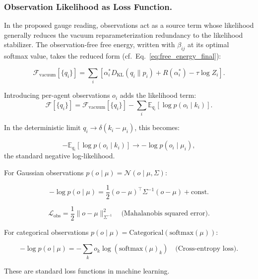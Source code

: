\documentclass[twoside,11pt]{article}
\begin{document}
\subsubsection{Observation Likelihood as Loss Function.}

In the proposed gauge reading, observations act as a source term whose likelihood generally reduces the vacuum reparameterization redundancy to the likelihood stabilizer. The observation-free free energy, written with $\beta_{ij}$ at its optimal softmax value, takes the reduced form (cf.\ Eq.~\ref{eq:free_energy_final}):

\begin{equation}
\mathcal{F}_{\text{vacuum}}[\{q_i\}]
=\sum_i\left[\alpha_i^*D_{\mathrm{KL}}(q_i\|p_i)+R(\alpha_i^*)-\tau\log Z_i\right].
\end{equation}

Introducing per-agent observations $o_i$ adds the likelihood term:
\begin{equation}
\mathcal{F}[\{q_i\}] = \mathcal{F}_{\text{vacuum}}[\{q_i\}] - \sum_i \mathbb{E}_{q_i}[\log p(o_i \mid k_i)].
\end{equation}

In the deterministic limit $q_i \to \delta(k_i - \mu_i)$, this becomes:

\begin{equation}
-\mathbb{E}_{q_i}[\log p(o_i \mid k_i)] \to -\log p(o_i \mid \mu_i),
\end{equation}
the standard negative log-likelihood.

For Gaussian observations $p(o \mid \mu) = \mathcal{N}(o \mid \mu, \Sigma)$:

\begin{equation}
-\log p(o \mid \mu) = \frac{1}{2}(o - \mu)^\top \Sigma^{-1} (o - \mu) + \text{const.}
\end{equation}

\begin{equation}
\mathcal{L}_{\text{obs}}
=\frac{1}{2}\|o-\mu\|^2_{\Sigma^{-1}}
\quad\text{(Mahalanobis squared error)}.
\end{equation}

For categorical observations $p(o \mid \mu) = \mathrm{Categorical}(\mathrm{softmax}(\mu))$:

\begin{equation}
-\log p(o \mid \mu) = -\sum_k o_k \log(\mathrm{softmax}(\mu)_k) \quad \text{(Cross-entropy loss)}.
\end{equation}

These are standard loss functions in machine learning.
\end{document}
